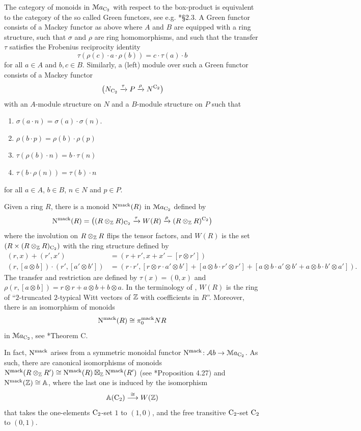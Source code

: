 \begin{remark}
\label{remark:green}%
The category of monoids in $\mathcal{M}a_{\mathrm{C_2}}$ with respect to the box-product is equivalent to the category of the so called Green functors, see e.g. \cite{Bouc}*{\S2.3}. A Green functor consists of a Mackey functor as above where $A$ and $B$ are equipped with a ring structure, such that $\sigma$ and $\rho$ are ring homomorphisms, and such that the transfer $\tau$ satisfies the Frobenius reciprocity identity
\[
\tau(\rho(c)\cdot a\cdot \rho(b))=c\cdot \tau(a)\cdot b
\]
for all $a\in A$ and $b,c\in B$. %
Similarly, a (left) module over such a Green functor consists of a Mackey functor 
\[
\big(N_{\mathrm{C_2}}\xrightarrow{\tau}P\xrightarrow{\rho}N^{\mathrm{C_2}}\big)
\]
with an $A$-module structure on $N$ and a $B$-module structure on $P$ such that
\begin{enumerate}
\item
$\sigma(a\cdot n)=\sigma(a)\cdot\sigma(n)$.
\item
$\rho(b\cdot p)=\rho(b)\cdot\rho(p)$
\item
$\tau(\rho(b)\cdot n)=b\cdot\tau(n)$
\item
$\tau(b\cdot \rho(n))=\tau(b)\cdot n$
\end{enumerate}
for all $a\in A$, $b\in B$, $n\in N$ and $p\in P$.
\end{remark}



\begin{example}
\label{example:mackey}%
Given a ring $R$, there is a monoid $\mathrm{N}^{\mathrm{mack}}(R)$ in $\mathcal{M}a_{\mathrm{C_2}}$ defined by
\[
\mathrm{N}^{\mathrm{mack}}(R)=\big((R\otimes_{\mathbb{Z}} R)_{\mathrm{C_2}}\xrightarrow{\tau} W(R)\xrightarrow{\rho}(R\otimes_{\mathbb{Z}} R)^{\mathrm{C_2}}\big)
\]
where the involution on $R\otimes_{\mathbb{Z}} R$ flips the tensor factors, and $W(R)$ is the set $(R\times (R\otimes_{\mathbb{Z}} R)_{\mathrm{C_2}})$ with the ring structure defined by
\begin{align*}
(r,x)+(r',x')&=(r+r',x+x'-[r\otimes r'])
\\
(r,[a\otimes b])\cdot(r',[a'\otimes b'])&=(r\cdot r',[r\otimes r\cdot  a'\otimes b']+[a\otimes b\cdot r'\otimes r']+[a\otimes b\cdot a'\otimes b'+a\otimes b\cdot b'\otimes a']).
\end{align*}
The transfer and restriction are defined by $\tau(x)=(0,x)$ and $\rho(r,[a\otimes b])=r\otimes r+a\otimes b+b\otimes a$. In the terminology of  \cites{DKNP1,DKNP2}, $W(R)$ is the ring of ``$2$-truncated $2$-typical Witt vectors of $\mathbb{Z}$ with coefficients in $R$''. Moreover, there is an isomorphism of monoids
\[
\mathrm{N}^{\mathrm{mack}}(R)\cong \pi^{\mathrm{mack}}_0NR
\]
in $\mathcal{M}a_{\mathrm{C_2}}$, see \cite{DKNP2}*{Theorem C}.

In fact, $\mathrm{N}^{\mathrm{mack}}$ arises from a symmetric monoidal functor $\mathrm{N}^{\mathrm{mack}}\colon\mathcal{A}b\to\mathcal{M}a_{\mathrm{C_2}}$. As such, there are canonical isomorphisms of monoids $\mathrm{N}^{\mathrm{mack}}(R\otimes_{\mathbb{Z}} R')\cong \mathrm{N}^{\mathrm{mack}}(R)\boxtimes_{\mathbb{Z}} \mathrm{N}^{\mathrm{mack}}(R')$ (see \cite{Read}*{Proposition 4.27}) and $\mathrm{N}^{\mathrm{mack}}(\mathbb{Z})\cong\mathbb{A}$, where the last one is induced by the isomorphism
\[
\mathbb{A}(\mathrm{C_2})\stackrel{\cong}{\longrightarrow} W(\mathbb{Z})
\]
that takes the one-elements $\mathrm{C_2}$-set $1$ to $(1,0)$, and the free transitive  $\mathrm{C_2}$-set $\mathrm{C_2}$ to $(0,1)$.
\end{example}



